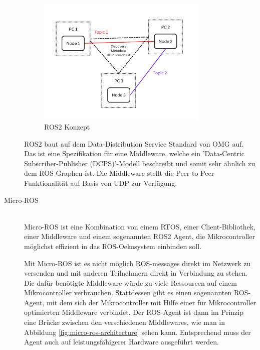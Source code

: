 \begin{flushleft}
\begin{description}
        \begin{figure}[h!]
            \centering
            \includegraphics[width=0.8\textwidth]{imgs/ROS2_concept_graph.png}
            \caption{ROS2 Konzept}
            \label{fig:ros2_concept_graph}%
        \end{figure}

        ROS2 baut auf dem Data-Distribution Service Standard von OMG auf. 
        Das ist eine Spezifikation für eine Middleware, welche ein 'Data-Centric Subscriber-Publisher (DCPS)'-Modell beschreibt und somit sehr ähnlich zu dem ROS-Graphen ist. 
        Die Middleware stellt die Peer-to-Peer Funktionalität auf Basis von UDP zur Verfügung.
        \cite{ros} \cite{omg_dds} \cite{ros2_concepts}

        \item[Micro-ROS]\hfill\\
        Micro-ROS ist eine Kombination von einem RTOS, einer Client-Bibliothek, einer Middleware und einem sogenannten ROS2 Agent, 
        die Mikrocontroller möglichst effizient in das ROS-Oekosystem einbinden soll.
        
        Mit Micro-ROS ist es nicht möglich ROS-messages direkt im Netzwerk zu versenden und mit anderen Teilnehmern direkt in Verbindung zu stehen.
        Die dafür benötigte Middleware würde zu viele Ressourcen auf einem Mikrocontroller verbrauchen. 
        Stattdessen gibt es einen sogenannten ROS-Agent, mit dem sich der Mikrocontroller mit Hilfe einer für Mikrocontroller optimierten Middleware verbindet.
        Der ROS-Agent ist dann im Prinzip eine Brücke zwischen den verschiedenen Middlewares, wie man in Abbildung \ref{fig:micro-ros-architecture} sehen kann. Entsprechend muss der Agent auch auf leistungsfähigerer Hardware ausgeführt werden.    
        \cite{micro_ros_concepts}


\end{description}
\end{flushleft}
